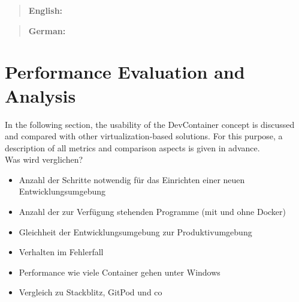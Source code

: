 \documentclass[12pt, a4paper]{article}
\begin{document}



\maketitle
\begin{otherlanguage}{english}
    \begin{abstract}
        \textbf{English:} \lipsum[20]
    \end{abstract}
\end{otherlanguage}
\begin{otherlanguage}{ngerman}
    \begin{abstract}
        \textbf{German:} \lipsum[20]
    \end{abstract}
\end{otherlanguage}
\newpage

\tableofcontents
\newpage

\setcounter{lastroman}{\value{page}}













\section{Performance Evaluation and Analysis}\label{sec::eval}
In the following section, the usability of the DevContainer concept is discussed and compared with other virtualization-based solutions. For this purpose, a description of all metrics and comparison aspects is given in advance.\\
Was wird verglichen?
\begin{itemize}
    \item Anzahl der Schritte notwendig für das Einrichten einer neuen Entwicklungsumgebung
    \item Anzahl der zur Verfügung stehenden Programme (mit und ohne Docker)
    \item Gleichheit der Entwicklungsumgebung zur Produktivumgebung
    \item Verhalten im Fehlerfall
    \item Performance wie viele Container gehen unter Windows
    \item Vergleich zu Stackblitz, GitPod und co
\end{itemize}
\end{document}
